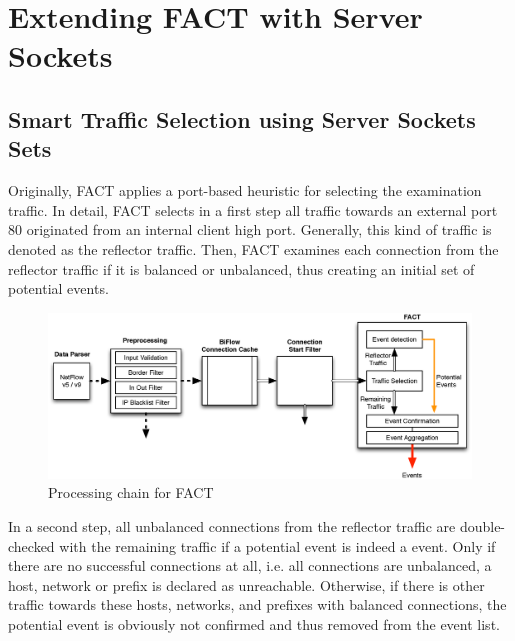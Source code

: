 
\chapter{Extending FACT with Server Sockets\label{chapter:integration}}

\section{Smart Traffic Selection using Server Sockets Sets\label{section:ses_traffic_selection}}
Originally, FACT applies a port-based heuristic for selecting the examination 
traffic. In detail, FACT selects in a first step all traffic towards an external 
port 80 originated from an internal client high port. Generally, this kind of 
traffic is denoted as the reflector traffic. Then, FACT examines each connection 
from the reflector traffic if it is balanced or unbalanced, thus creating an 
initial set of potential events. 

\begin{figure}
	[!b] \centering
	\includegraphics[width=\linewidth]{images/FACT.eps}
	\caption{Processing chain for FACT} 
	\label{fig:fact_chain} 
\end{figure}

In a second step, all unbalanced connections from the reflector traffic are 
double-checked with the remaining traffic if a potential event is indeed a 
event. Only if there are no successful connections at all, i.e. all connections 
are unbalanced, a host, network or prefix is declared as unreachable. Otherwise, 
if there is other traffic towards these hosts, networks, and prefixes with 
balanced connections, the potential event is obviously not confirmed and thus 
removed from the event list. 

